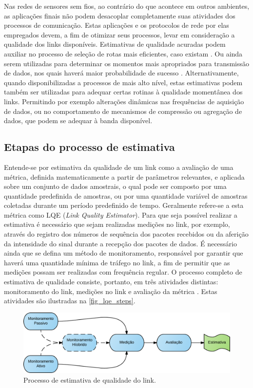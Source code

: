\documentclass[
	12pt,				%
	openright,			%
	oneside,
	a4paper,			%
	english,			%
	french,				%
	spanish,			%
	brazil				%
	]{abntex2}
\begin{document}
Nas redes de sensores sem fios, ao contrário do que acontece em outros ambientes, as aplicações finais não podem desacoplar completamente suas atividades dos processos de comunicação. Estas aplicações e os protocolos de rede por elas empregados devem, a fim de otimizar seus processos, levar em consideração a qualidade dos links disponíveis. Estimativas de qualidade acuradas podem auxiliar no processo de seleção de rotas mais eficientes, caso existam \cite{YanjunLi2005}. Ou ainda serem utilizadas para determinar os momentos mais apropriados para transmissão de dados, nos quais haverá maior probabilidade de sucesso \cite{Srinivasan2008}. Alternativamente, quando disponibilizadas a processos de mais alto nível, estas estimativas podem também ser utilizadas para adequar certas rotinas à qualidade momentânea dos links. Permitindo por exemplo alterações dinâmicas nas frequências de aquisição de dados, ou no comportamento de mecanismos de compressão ou agregação de dados, que podem se adequar à banda disponível.

\subsection{Etapas do processo de estimativa}

Entende-se por estimativa da qualidade de um link como a avaliação de uma métrica, definida matematicamente a partir de parâmetros relevantes, e aplicada sobre um conjunto de dados amostrais, o qual pode ser composto por uma quantidade predefinida de amostras, ou por uma quantidade variável de amostras coletadas durante um período predefinido de tempo. Geralmente refere-se a esta métrica como LQE (\textit{Link Quality Estimator}). Para que seja possível realizar a estimativa é necessário que sejam realizadas medições no link, por exemplo, através do registro dos números de sequência dos pacotes recebidos ou da aferição da intensidade do sinal durante a recepção dos pacotes de dados. É necessário ainda que se defina um método de monitoramento, responsável por garantir que haverá uma quantidade mínima de tráfego no link, a fim de permitir que as medições possam ser realizadas com frequência regular. O processo completo de estimativa de qualidade consiste, portanto, em três atividades distintas: monitoramento do link, medições no link e avaliação da métrica \cite{Baccour2012}. Estas atividades são ilustradas na \autoref{fig_lqe_steps}.

\begin{figure}[thb]
	\caption{\label{fig_lqe_steps}Processo de estimativa de qualidade do link.}
	\begin{center}
		\includegraphics[width=\linewidth]{WSN_LQE_Steps}
	\end{center}
\end{figure}
\end{document}
